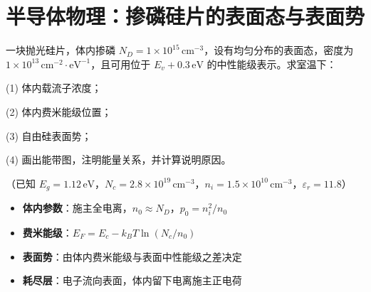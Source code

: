 \section{半导体物理：掺磷硅片的表面态与表面势}
\label{sec:surface-states-silicon}

\begin{modelbox}[题目：表面态对硅表面势及能带的影响]
一块抛光硅片，体内掺磷 $N_D=1\times10^{15}\,\text{cm}^{-3}$，设有均匀分布的表面态，密度为 $1\times10^{13}\,\text{cm}^{-2}\cdot\text{eV}^{-1}$，且可用位于 $E_v+0.3\,\text{eV}$ 的中性能级表示。求室温下：

(1) 体内载流子浓度；

(2) 体内费米能级位置；

(3) 自由硅表面势；

(4) 画出能带图，注明能量关系，并计算说明原因。

（已知 $E_g=1.12\,\text{eV}$，$N_c=2.8\times10^{19}\,\text{cm}^{-3}$，$n_i=1.5\times10^{10}\,\text{cm}^{-3}$，$\varepsilon_r=11.8$）
\end{modelbox}

\begin{tipbox}[考点快速分析]
\begin{itemize}
    \item \textbf{体内参数}：施主全电离，$n_0\approx N_D$，$p_0=n_i^2/n_0$
    \item \textbf{费米能级}：$E_F=E_c-k_BT\ln(N_c/n_0)$
    \item \textbf{表面势}：由体内费米能级与表面中性能级之差决定
    \item \textbf{耗尽层}：电子流向表面，体内留下电离施主正电荷
\end{itemize}
\end{tipbox}

